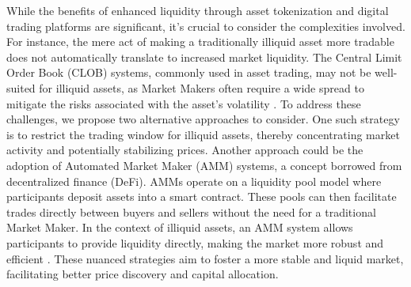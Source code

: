 \begin{itemize}
    While the benefits of enhanced liquidity through asset tokenization and digital trading platforms are significant, it's crucial to consider the complexities involved. For instance, the mere act of making a traditionally illiquid asset more tradable does not automatically translate to increased market liquidity. The Central Limit Order Book (CLOB) systems, commonly used in asset trading, may not be well-suited for illiquid assets, as Market Makers often require a wide spread to mitigate the risks associated with the asset's volatility \citep{maureen2001overview}. To address these challenges, we propose two alternative approaches to consider. One such strategy is to restrict the trading window for illiquid assets, thereby concentrating market activity and potentially stabilizing prices. Another approach could be the adoption of Automated Market Maker (AMM) systems, a concept borrowed from decentralized finance (DeFi). AMMs operate on a liquidity pool model where participants deposit assets into a smart contract. These pools can then facilitate trades directly between buyers and sellers without the need for a traditional Market Maker. In the context of illiquid assets, an AMM system allows participants to provide liquidity directly, making the market more robust and efficient \citep{aoyagi2020liquidity}. These nuanced strategies aim to foster a more stable and liquid market, facilitating better price discovery and capital allocation.
\end{itemize}